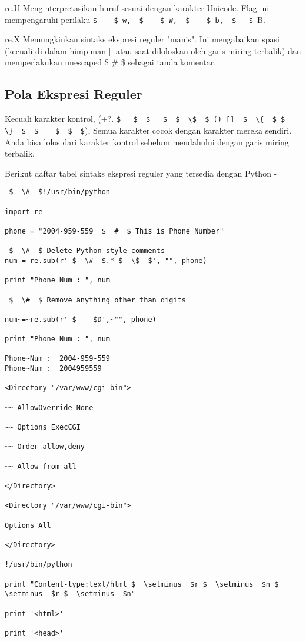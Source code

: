 \begin{enumerate}
\begin{enumerate}
re.U
Menginterpretasikan huruf sesuai dengan karakter Unicode. Flag ini mempengaruhi perilaku  \verb|$    $ w,  $    $ W,  $    $ b,  $   $ |B.

re.X
Memungkinkan sintaks ekspresi reguler "manis". Ini mengabaikan spasi (kecuali di dalam himpunan [] atau saat diloloskan oleh garis miring terbalik) dan memperlakukan unescaped  \$  \#  \$ sebagai tanda komentar.

\subsection{Pola Ekspresi Reguler}
Kecuali karakter kontrol, (+?.  \verb|$   $  $   $  $  \$  $ () []  $  \{  $ $  \}  $  $    $  $  $|), Semua karakter cocok dengan karakter mereka sendiri. Anda bisa lolos dari karakter kontrol sebelum mendahului dengan garis miring terbalik.

Berikut daftar tabel sintaks ekspresi reguler yang tersedia dengan Python -
\begin{verbatim}
 $  \#  $!/usr/bin/python

import re

phone = "2004-959-559  $  #  $ This is Phone Number"

 $  \#  $ Delete Python-style comments
num = re.sub(r' $  \#  $.* $  \$  $', "", phone)

print "Phone Num : ", num

 $  \#  $ Remove anything other than digits

num~=~re.sub(r' $    $D',~"", phone)

print "Phone Num : ", num

Phone~Num :  2004-959-559
Phone~Num :  2004959559

<Directory "/var/www/cgi-bin">

~~ AllowOverride None

~~ Options ExecCGI

~~ Order allow,deny

~~ Allow from all

</Directory>

<Directory "/var/www/cgi-bin">

Options All

</Directory>

!/usr/bin/python

print "Content-type:text/html $  \setminus  $r $  \setminus  $n $  \setminus  $r $  \setminus  $n"

print '<html>'

print '<head>'


\end{verbatim}
\end{enumerate}
\end{enumerate}
